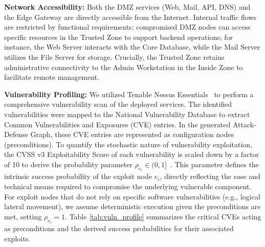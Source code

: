 \documentclass[conference]{IEEEtran}
\theoremstyle{definition} %
\theoremstyle{plain} %
\begin{document}
\textbf{Network Accessibility:} 
Both the DMZ services (Web, Mail, API, DNS) and the Edge Gateway are directly accessible from the Internet. 
Internal traffic flows are restricted by functional requirements: compromised DMZ nodes can access specific resources in the Trusted Zone to support backend operations; for instance, the Web Server interacts with the Core Database, while the Mail Server utilizes the File Server for storage. 
Crucially, the Trusted Zone retains administrative connectivity to the Admin Workstation in the Inside Zone to facilitate remote management. 

\textbf{Vulnerability Profiling:} 
We utilized Tenable Nessus Essentials~\cite{yoran2002nessus} to perform a comprehensive vulnerability scan of the deployed services. The identified vulnerabilities were mapped to the National Vulnerability Database to extract Common Vulnerabilities and Exposures (CVE) entries. 
In the generated Attack-Defense Graph, these CVE entries are represented as configuration nodes (preconditions). 
To quantify the stochastic nature of vulnerability exploitation, the CVSS v3 Exploitability Score of each vulnerability is scaled down by a factor of 10 to derive the probability parameter $\rho_{e_i} \in (0,1]$~\cite{FIRST2015-CVSSv30, munoz2017exact}. This parameter defines the intrinsic success probability of the exploit node $e_i$, directly reflecting the ease and technical means required to compromise the underlying vulnerable component. 
For exploit nodes that do not rely on specific software vulnerabilities (e.g., logical lateral movement), we assume deterministic execution given the preconditions are met, setting $\rho_{e_i}=1$.
Table \ref{tab:vuln_profile} summarizes the critical CVEs acting as preconditions and the derived success probabilities for their associated exploits.

\begin{table}[htbp]
\caption{Vulnerability Configurations and Associated Exploit Probabilities}
\label{tab:vuln_profile}
\centering
\renewcommand{\arraystretch}{1.3} %
\end{table}
\end{document}
